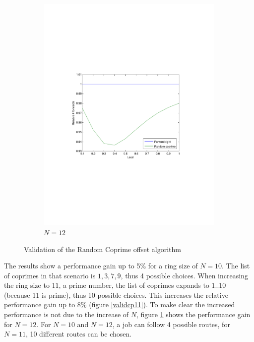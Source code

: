 \documentclass[10pt,a4paper]{article}
\begin{document}
\begin{figure}
\begin{subfigure}[b]{0.49\textwidth}
			\includegraphics[clip=true, trim=9em 24em 9em 24em, width=\textwidth]{resources/plotrandcoprime12.pdf}
			\caption{$N=12$}
			\label{validcp12}
		\end{subfigure}
\caption{Validation of the Random Coprime offset algorithm}
\label{validcp}
\end{figure}

The results show a performance gain up to 5\% for a ring size of $N=10$. The list of coprimes in that scenario is ${1, 3, 7, 9}$, thus 4 possible choices. When increasing the ring size to $11$, a prime number, the list of coprimes expands to ${1..10}$ (because 11 is prime), thus 10 possible choices. This increases the relative performance gain up to 8\% (figure \ref{validcp11}). To make clear the increased performance is not due to the increase of $N$, figure \ref{validcp12} shows the performance gain for $N=12$. For $N=10$ and $N=12$, a job can follow 4 possible routes, for $N=11$, 10 different routes can be chosen.
\end{document}
